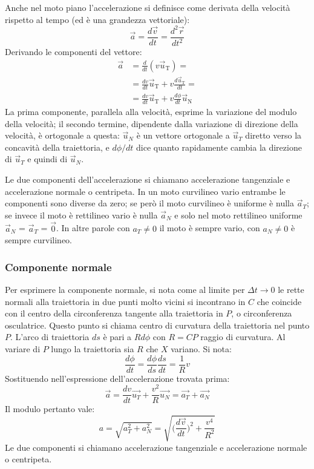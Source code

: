 \documentclass[class=book, crop=false, oneside, 12pt]{standalone}
\begin{document}
  Anche nel moto piano l'accelerazione si definisce come derivata della velocità rispetto al tempo (ed è una grandezza vettoriale):
  \begin{equation*}
   \overrightarrow{a} = \frac{d \overrightarrow{v}}{dt} = \frac{d^2 \overrightarrow{r}}{dt^2}
  \end{equation*}
  Derivando le componenti del vettore:
  \begin{align*}
    \overrightarrow{a}&=\frac{d}{d t}\left(v \overrightarrow{u}_{\mathrm{T}}\right)=\\
                      &=\frac{d v}{d t} \overrightarrow{u}_{\mathrm{T}}+v \frac{d \overrightarrow{u}_{\mathrm{T}}}{d t}=\\
                      &=\frac{d v}{d t} \overrightarrow{u}_{\mathrm{T}}+v \frac{d \phi}{d t} \overrightarrow{u}_{\mathrm{N}}
  \end{align*}
  La prima componente, parallela alla velocità, esprime la variazione del modulo della velocità; il secondo termine, dipendente dalla variazione di direzione della velocità, è ortogonale a questa: \(\overrightarrow{u}_N\) è un vettore ortogonale a \(\overrightarrow{u}_T\) diretto verso la concavità della traiettoria, e \(d \phi/dt \) dice quanto rapidamente cambia la direzione di \(\overrightarrow{u}_T\)  e quindi di \(\overrightarrow{u}_N\).

  Le due componenti dell'accelerazione si chiamano accelerazione tangenziale e accelerazione normale o centripeta.
  In un moto curvilineo vario entrambe le componenti sono diverse da zero; se però il moto curvilineo è uniforme è nulla \(\overrightarrow{a}_T\); se invece il moto è rettilineo vario è nulla \(\overrightarrow{a}_N\) e solo nel moto rettilineo uniforme \(\overrightarrow{a}_N\) = \(\overrightarrow{a}_T\) = \(\overrightarrow{0}\).
  In altre parole con \(a_T \neq 0\) il moto è sempre vario, con \(a_N \neq 0\) è  sempre curvilineo.
		\subsubsection{Componente normale}
			Per esprimere la componente normale, si nota come al limite per $\Delta t\rightarrow 0$ le rette normali alla traiettoria in due punti molto vicini si incontrano in $C$ che coincide con il centro della circonferenza tangente alla traiettoria in $P$, o circonferenza osculatrice.
			Questo punto si chiama centro di curvatura della traiettoria nel punto $P$.
			L'arco di traiettoria $ds$ \`e pari a $Rd\phi$ con $R=CP$ raggio di curvatura.
			Al variare di $P$ lungo la traiettoria sia $R$ che $X$ variano.
			Si nota:
			$$\dfrac{d\phi}{dt}=\dfrac{d\phi}{ds}\dfrac{ds}{dt}=\dfrac{1}{R}v$$
			Sostituendo nell'espressione dell'accelerazione trovata prima:
      $$\overrightarrow{a}=\dfrac{dv}{dt}\overrightarrow{u_T}+\dfrac{v^2}{R}\overrightarrow{u_N}=\overrightarrow{a_T}+\overrightarrow{a_N}$$
			Il modulo pertanto vale:
      $$a=\sqrt{a^2_T+a^2_N}=\sqrt{\biggl(\dfrac{d\overrightarrow{v}}{dt}\biggr)^2+\dfrac{v^4}{R^2}}$$
			Le due componenti si chiamano accelerazione tangenziale e accelerazione normale o centripeta.
\end{document}

